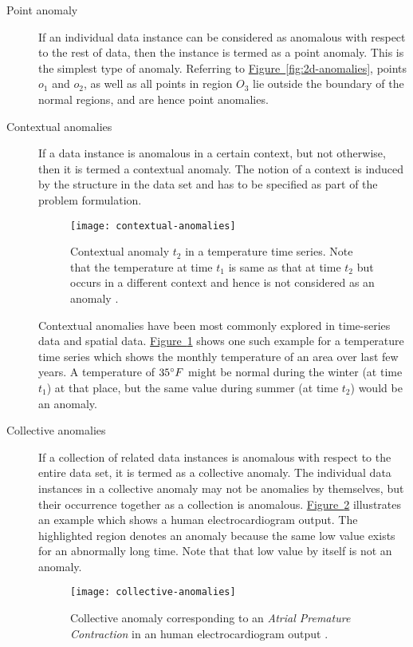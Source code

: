 \begin{description}
\item[Point anomaly] If an individual data instance can be considered as 
anomalous with respect to the rest of data, then the instance is termed as a 
point anomaly. This is the simplest type of anomaly. Referring to 
\hyperref[fig:2d-anomalies]{Figure~\ref{fig:2d-anomalies}}, points $o_{1}$ and 
$o_{2}$, as well as all points in region $O_{3}$ lie outside the boundary of the
normal regions, and are hence point anomalies.

\item[Contextual anomalies] If a data instance is anomalous in a certain 
context, but not otherwise, then it is termed a contextual anomaly. The notion 
of a context is induced by the structure in the data set and has to be specified
as part of the problem formulation.

\begin{figure}
\centering
\texttt{[image: contextual-anomalies]}
\caption[Contextual anomaly $t_{2}$ in a temperature time series.]{Contextual 
anomaly $t_{2}$ in a temperature time series. Note that the temperature at time 
$t_{1}$ is same as that at time $t_{2}$ but occurs in a different context and 
hence is not considered as an anomaly \cite{Chandola:2007}.}
\label{fig:contextual-anomalies}
\end{figure}

Contextual anomalies have been most commonly explored in time-series data and 
spatial data. \hyperref[fig:contextual-anomalies]
{Figure~\ref{fig:contextual-anomalies}} shows one such example for a temperature
time series which shows the monthly temperature of an area over last few years. 
A temperature of $35^\circ F$ might be normal during the winter (at time 
$t_{1}$) at that place, but the same value during summer (at time $t_{2}$) would
be an anomaly.

\item[Collective anomalies] If a collection of related data instances is 
anomalous with respect to the entire data set, it is termed as a collective 
anomaly. The individual data instances in a collective anomaly may not be 
anomalies by themselves, but their occurrence together as a collection is 
anomalous. \hyperref[fig:collective-anomalies]
{Figure~\ref{fig:collective-anomalies}} illustrates an example which shows a 
human electrocardiogram output. The highlighted region denotes an anomaly 
because the same low value exists for an abnormally long time. Note that that 
low value by itself is not an anomaly.

\begin{figure}
\centering
\texttt{[image: collective-anomalies]}
\caption[Collective anomaly corresponding to an \emph{Atrial Premature 
Contraction} in an human electrocardiogram output.]{Collective anomaly 
corresponding to an \emph{Atrial Premature Contraction} in an human 
electrocardiogram output \cite{Goldberger:2000}.}
\label{fig:collective-anomalies}
\end{figure}

\end{description}

